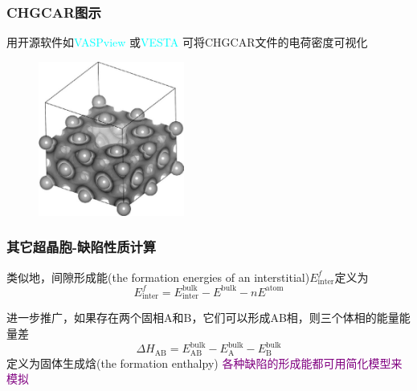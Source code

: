 \frame
{
	\frametitle{\textrm{CHGCAR}图示}
	用开源软件如\textcolor{cyan}{\textrm{VASPview}}%
	或\textcolor{cyan}{\textrm{VESTA}}%
	可将\textrm{CHGCAR}文件的电荷密度可视化%
\begin{figure}[h!]
\centering
\vskip -8pt
\includegraphics[height=2.0in,viewport=0 0 640 660,clip]{Figures/Pt_vacancy-CHGCAR.png}
\caption{\fontsize{6.2pt}{5.2pt}}%
\label{Pt_vacancy-Density}
\end{figure}
{\vskip -8pt\fontsize{6.8pt}{5.2pt}\selectfont{注意:~图中空位附近的空白区域(图中只显示了超晶胞的下半区域)和每个原子附近近乎均匀分布的电子分布}}
}

\frame
{
	\frametitle{其它超晶胞-缺陷性质计算}

类似地，间隙形成能\textrm{(the formation energies of an interstitial)}$E_{\mathrm{inter}}^f$定义为
\begin{displaymath}
	E_{\mathrm{inter}}^f=E_{\mathrm{inter}}^{\mathrm{bulk}}-E^{\mathrm{bulk}}-nE^{\mathrm{atom}}
\end{displaymath}
{\fontsize{6.2pt}{5.2pt}}

进一步推广，如果存在两个固相\textrm{A}和{B}，它们可以形成\textrm{AB}相，则三个体相的能量能量差
\begin{displaymath}
	\Delta H_{\mathrm{AB}}=E_{\mathrm{AB}}^{\mathrm{bulk}}-E_{\mathrm{A}}^{\mathrm{bulk}}-E_{\mathrm{B}}^{\mathrm{bulk}}
\end{displaymath}
定义为固体生成焓\textrm{(the formation enthalpy)}
\vskip 5pt
\textcolor{purple}{各种缺陷的形成能都可用简化模型来模拟}\\
{\fontsize{7.0pt}{5.2pt}\selectfont{用户在构造包含缺陷的超晶胞时，必须切记，超晶胞要设计得足够大，确保缺陷间的相互作用足够小}}
}

